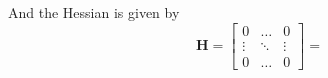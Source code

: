 And the Hessian is given by 
\[
\textbf{H} = 
\begin{bmatrix}
0 & \ldots & 0 \\
\vdots & \ddots & \vdots \\
0 & \ldots & 0
\end{bmatrix}
=
\]















